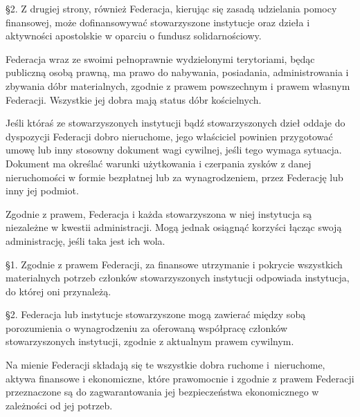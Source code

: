 \S{}2. Z drugiej strony, również Federacja, kierując się zasadą udzielania pomocy finansowej, może dofinansowywać stowarzyszone instytucje oraz dzieła i aktywności apostolskie w oparciu o fundusz solidarnościowy.




 Federacja wraz ze swoimi pełnoprawnie wydzielonymi terytoriami, będąc publiczną osobą prawną, ma prawo do nabywania, posiadania, administrowania i zbywania dóbr materialnych, zgodnie z prawem powszechnym i prawem własnym Federacji. Wszystkie jej dobra mają status dóbr kościelnych.
 




 Jeśli któraś ze stowarzyszonych instytucji bądź stowarzyszonych dzieł oddaje do dyspozycji Federacji dobro nieruchome, jego właściciel powinien przygotować umowę lub inny stosowny dokument wagi cywilnej, jeśli tego wymaga sytuacja. Dokument ma określać warunki użytkowania i czerpania zysków z danej nieruchomości w formie bezpłatnej lub za wynagrodzeniem, przez Federację lub inny jej podmiot.
 


 Zgodnie z prawem, Federacja i każda stowarzyszona w niej instytucja są niezależne w kwestii administracji. Mogą jednak osiągnąć korzyści łącząc swoją administrację, jeśli taka jest ich wola.
 


 \S{}1. Zgodnie z prawem Federacji, za finansowe utrzymanie i pokrycie wszystkich materialnych potrzeb członków stowarzyszonych instytucji odpowiada instytucja, do której oni przynależą.


\S{}2. Federacja lub instytucje stowarzyszone mogą zawierać między sobą porozumienia o wynagrodzeniu za oferowaną współpracę członków stowarzyszonych instytucji, zgodnie z aktualnym prawem cywilnym.






 Na mienie Federacji składają się te wszystkie dobra ruchome \mbox{i nieruchome}, aktywa finansowe i ekonomiczne, które prawomocnie i zgodnie z prawem Federacji przeznaczone są do zagwarantowania jej bezpieczeństwa ekonomicznego w zależności od jej potrzeb.


 


